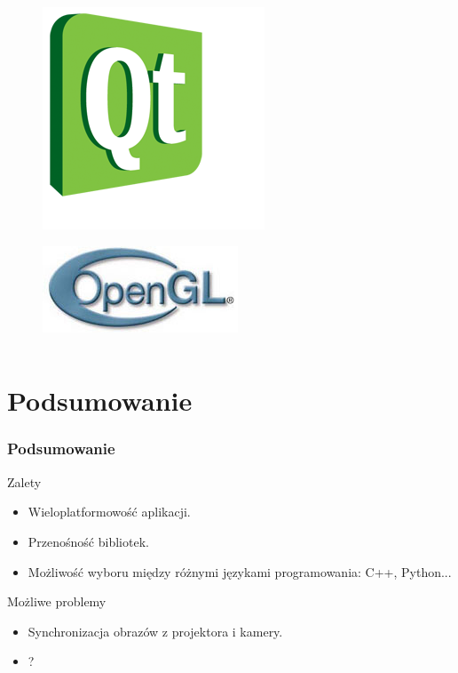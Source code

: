\documentclass{beamer}
\begin{document}
\begin{frame}
\begin{columns}
\begin{column}{6cm}
      \begin{figure}[htb]
	\begin{center}
	  \includegraphics[angle=0,scale=0.15]{qt.png}
	\end{center}
      \end{figure}
      
      \begin{figure}[htb]
	\begin{center}
	  \includegraphics[angle=0,scale=0.2]{opengl.jpg}
	\end{center}
      \end{figure}
     
    \end{column}

  \end{columns}
    
\end{frame}

\section{Podsumowanie}
\begin{frame}\frametitle{Podsumowanie}

  \begin{block}{Zalety}
   \begin{itemize}
    \item Wieloplatformowość aplikacji.
    \item Przenośność bibliotek.
    \item Możliwość wyboru między różnymi językami programowania: C++, Python...
   \end{itemize}

  \end{block}


  \begin{alertblock}{Możliwe problemy}
    \begin{itemize}
     \item Synchronizacja obrazów z projektora i kamery.
     \item ?
    \end{itemize}
  \end{alertblock}
\end{frame}
\end{document}
